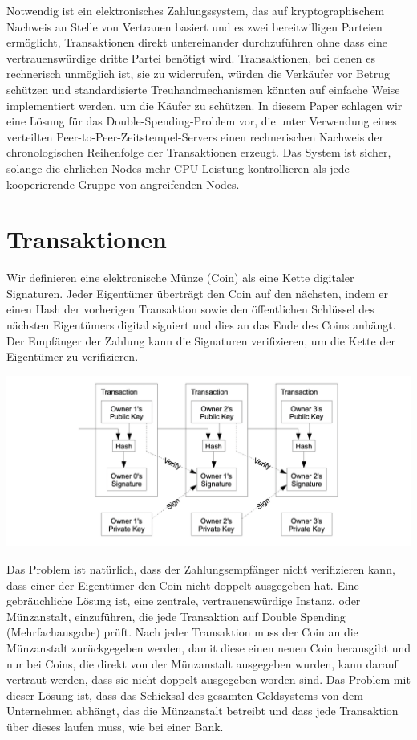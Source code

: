 \documentclass[10pt]{article}
\begin{document}
	Notwendig ist ein elektronisches Zahlungssystem, das auf kryptographischem Nachweis an Stelle von Vertrauen basiert und es zwei bereitwilligen Parteien ermöglicht, Transaktionen direkt untereinander durchzuführen ohne dass eine vertrauenswürdige dritte Partei benötigt wird. Transaktionen, bei denen es rechnerisch unmöglich ist, sie zu widerrufen, würden die Verkäufer vor Betrug schützen und standardisierte Treuhandmechanismen könnten auf einfache Weise implementiert werden, um die Käufer zu schützen. In diesem Paper schlagen wir eine Lösung für das Double-Spending-Problem vor, die unter Verwendung eines verteilten Peer-to-Peer-Zeitstempel-Servers einen rechnerischen Nachweis der chronologischen Reihenfolge der Transaktionen erzeugt. Das System ist sicher, solange die ehrlichen Nodes mehr CPU-Leistung kontrollieren als jede kooperierende Gruppe von angreifenden Nodes.
	
	\section{Transaktionen}
	Wir definieren eine elektronische Münze (Coin) als eine Kette digitaler Signaturen. Jeder Eigentümer überträgt den Coin auf den nächsten, indem er einen Hash der vorherigen Transaktion sowie den öffentlichen Schlüssel des nächsten Eigentümers digital signiert und dies an das Ende des Coins anhängt. Der Empfänger der Zahlung kann die Signaturen verifizieren, um die Kette der Eigentümer zu verifizieren.
	
	\begin{center}
		\includegraphics[scale=0.35]{pics/transactions.png}		
	\end{center}

	Das Problem ist natürlich, dass der Zahlungsempfänger nicht verifizieren kann, dass einer der Eigentümer den Coin nicht doppelt ausgegeben hat. Eine gebräuchliche Lösung ist, eine zentrale, vertrauenswürdige Instanz, oder Münzanstalt, einzuführen, die jede Transaktion auf Double Spending (Mehrfachausgabe) prüft. Nach jeder Transaktion muss der Coin an die Münzanstalt zurückgegeben werden, damit diese einen neuen Coin herausgibt und nur bei Coins, die direkt von der Münzanstalt ausgegeben wurden, kann darauf vertraut werden, dass sie nicht doppelt ausgegeben worden sind. Das Problem mit dieser Lösung ist, dass das Schicksal des gesamten Geldsystems von dem Unternehmen abhängt, das die Münzanstalt betreibt und dass jede Transaktion über dieses laufen muss, wie bei einer Bank.
	
\end{document}
